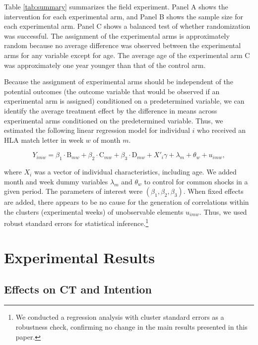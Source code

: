 \documentclass[12pt, a4paper]{article}
\begin{document}
Table \ref{tab:summary} summarizes the field experiment. Panel A shows the intervention for each experimental arm, and Panel B shows the sample size for each experimental arm. Panel C shows a balanced test of whether randomization was successful. The assignment of the experimental arms is approximately random because no average difference was observed between the experimental arms for any variable except for age. The average age of the experimental arm C was approximately one year younger than that of the control arm.

Because the assignment of experimental arms should be independent of the potential outcomes (the outcome variable that would be observed if an experimental arm is assigned) conditioned on a predetermined variable, we can identify the average treatment effect by the difference in means across experimental arms conditioned on the predetermined variable. Thus, we estimated the following linear regression model for individual \(i\) who received an HLA match letter in week \(w\) of month \(m\).

\begin{equation}
  Y_{imw} =
  \beta_1 \cdot \text{B}_{mw} + \beta_2 \cdot \text{C}_{mw} + \beta_3 \cdot \text{D}_{mw}
  + X'_i \gamma + \lambda_m + \theta_w + u_{imw}, \label{eq:reg}
\end{equation}

\noindent
where \(X_i\) was a vector of individual characteristics, including age. We added month and week dummy variables \(\lambda_m\) and \(\theta_w\) to control for common shocks in a given period. The parameters of interest were \((\beta_1, \beta_2, \beta_3)\). When fixed effects are added, there appears to be no cause for the generation of correlations within the clusters (experimental weeks) of unobservable elements \(u_{imw}\). Thus, we used robust standard errors for statistical inference.\footnote{We conducted a regression analysis with cluster standard errors as a robustness check, confirming no change in the main results presented in this paper.}

\hypertarget{result}{%
\section{Experimental Results}\label{result}}

\hypertarget{main}{%
\subsection{Effects on CT and Intention}\label{main}}
\end{document}

